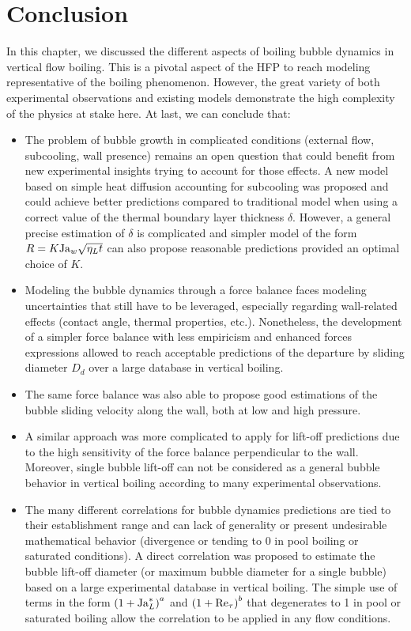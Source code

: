 \section{Conclusion}


In this chapter, we discussed the different aspects of boiling bubble dynamics in vertical flow boiling. This is a pivotal aspect of the HFP to reach modeling representative of the boiling phenomenon. However, the great variety of both experimental observations and existing models demonstrate the high complexity of the physics at stake here. At last, we can conclude that:

\begin{itemize}
\item The problem of bubble growth in complicated conditions (external flow, subcooling, wall presence) remains an open question that could benefit from new experimental insights trying to account for those effects. A new model based on simple heat diffusion accounting for subcooling was proposed and could achieve better predictions compared to traditional model when using a correct value of the thermal boundary layer thickness $\delta$. However, a general precise estimation of $\delta$ is complicated and simpler model of the form $R = K \mathrm{Ja}_{w}\sqrt{\eta_{L}t}$ can also propose reasonable predictions provided an optimal choice of $K$. 

\item Modeling the bubble dynamics through a force balance faces modeling uncertainties that still have to be leveraged, especially regarding wall-related effects (contact angle, thermal properties, etc.). Nonetheless, the development of a simpler force balance with less empiricism and enhanced forces expressions allowed to reach acceptable predictions of the departure by sliding diameter $D_{d}$ over a large database in vertical boiling.

\item The same force balance was also able to propose good estimations of the bubble sliding velocity along the wall, both at low and high pressure.

\item A similar approach was more complicated to apply for lift-off predictions due to the high sensitivity of the  force balance perpendicular to the wall. Moreover, single bubble lift-off can not be considered as a general bubble behavior in vertical boiling according to many experimental observations.

\item The many different correlations for bubble dynamics predictions are tied to their establishment range and can lack of generality or present undesirable mathematical behavior (\eg divergence or tending to 0 in pool boiling or saturated conditions). A direct correlation was proposed to estimate the bubble lift-off diameter (or maximum bubble diameter for a single bubble) based on a large experimental database in vertical boiling. The simple use of terms in the form $\left( 1+\mathrm{Ja}_{L}^{*} \right)^{a}$ and $\left( 1+\mathrm{Re}_{\tau} \right)^{b}$ that degenerates to 1 in pool or saturated boiling allow the correlation to be applied in any flow conditions.
\end{itemize}




